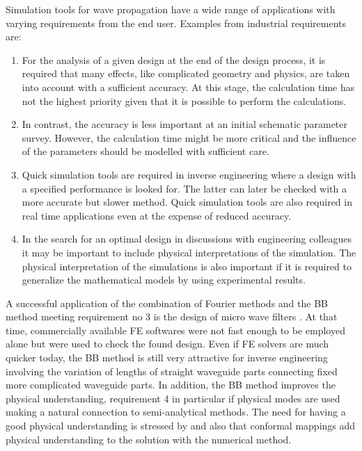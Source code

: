 \documentclass{svjour3}
\begin{document}
Simulation tools for wave propagation have a wide range of
applications with varying requirements from the end user. Examples
from industrial requirements are:
\begin{enumerate}
\item For the analysis of a given design at the end of the design
  process, it is required that many effects, like complicated geometry
  and physics, are taken into account with a sufficient accuracy. At
  this stage, the calculation time has not the highest priority given
  that it is possible to perform the calculations.
\item In contrast, the accuracy is less important at an initial
  schematic parameter survey. However, the calculation time might be
  more critical and the influence of the parameters should be modelled
  with sufficient care.
\item Quick simulation tools are required in inverse engineering where
  a design with a specified performance is looked for. The latter can
  later be checked with a more accurate but slower method. Quick
  simulation tools are also required in real time applications even at
  the expense of reduced accuracy.
\item In the search for an optimal design in discussions with
  engineering colleagues it may be important to include physical
  interpretations of the simulation. The physical interpretation of
  the simulations is also important if it is required to generalize
  the mathematical models by using experimental results.

\end{enumerate}

A successful application of the combination of Fourier methods and the
BB method meeting requirement no 3 is the design of micro wave filters
\cite{bironilsson2005}. At that time, commercially available FE
softwares were not fast enough to be employed alone but were used to
check the found design. Even if FE solvers are much quicker today, the
BB method is still very attractive for inverse engineering involving
the variation of lengths of straight waveguide parts connecting fixed
more complicated waveguide parts. In addition, the BB method improves
the physical understanding, requirement 4 in particular if physical
modes are used making a natural connection to semi-analytical
methods. The need for having a good physical understanding is stressed
by \cite{nachbin+daSilvaSimoes:2012} and also that conformal mappings
add physical understanding to the solution with the numerical method.
\end{document}
